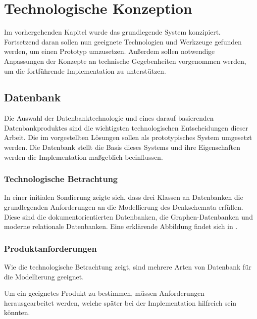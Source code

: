 \chapter{Technologische Konzeption}


Im vorhergehenden Kapitel wurde das grundlegende System konzipiert.
Fortsetzend daran sollen nun geeignete Technologien und Werkzeuge gefunden werden,
um einen Prototyp umzusetzen.
Außerdem sollen notwendige Anpassungen der Konzepte an technische Gegebenheiten vorgenommen werden,
um die fortf\"uhrende Implementation zu unterst\"utzen.





\section{Datenbank}

Die Auswahl der Datenbanktechnologie und eines darauf basierenden Datenbankproduktes sind die wichtigsten technologischen Entscheidungen dieser Arbeit.
Die im  vorgestellten Lösungen sollen als prototypisches System umgesetzt werden.
Die Datenbank stellt die Basis dieses Systems und ihre Eigenschaften werden die Implementation maßgeblich beeinflussen.


\subsection{Technologische Betrachtung}

In einer initialen Sondierung zeigte sich,
dass drei Klassen an Datenbanken die grundlegenden Anforderungen an die Modellierung des Denkschemata erfüllen.
Diese sind die dokumentorientierten Datenbanken, die Graphen-Datenbanken und moderne relationale Datenbanken. 
Eine erklärende Abbildung findet sich in .

\subsection{Produktanforderungen}

Wie die technologische Betrachtung zeigt,
sind mehrere Arten von Datenbank für die Modellierung geeignet.

Um ein geeignetes Produkt zu bestimmen,
m\"ussen Anforderungen herausgearbeitet werden,
welche sp\"ater bei der Implementation hilfreich sein k\"onnten.

